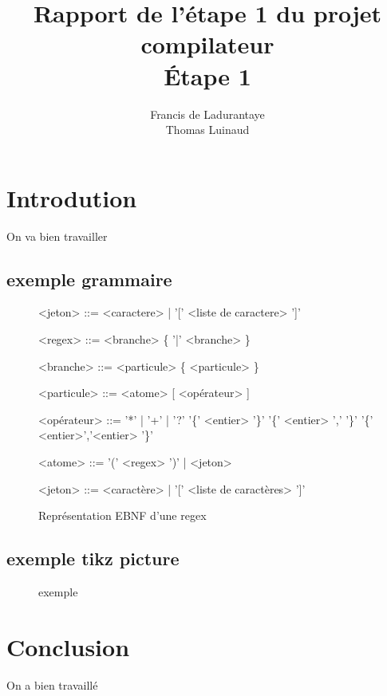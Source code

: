 \documentclass[]{article}
\title{Rapport de l'étape 1 du projet compilateur \\ Étape 1}
\author{Francis de Ladurantaye \\ Thomas Luinaud}
\begin{document}
\begin{titlepage}
	\maketitle
\end{titlepage}


\section{Introdution}
On va bien travailler

\subsection{exemple grammaire}
\begin{figure}[]
	\begin{grammarC}{<jeton> ::= <caractere> | '[' <liste de caractere> ']'}
		
		<regex> ::= <branche> \{ '|' <branche> \}
		
		<branche> ::= <particule> \{ <particule> \}
		
		<particule> ::= <atome>  [ <opérateur> ]
		
		<opérateur> ::= '*' | '+' | '?' 
		\alt  '\{' <entier> '\}' 
		\alt  '\{' <entier> ',' '\}' 
		\alt '\{' <entier>','<entier>  '\}'
		
		<atome> ::= '(' <regex> ')' | <jeton>
		
		<jeton> ::= <caractère> | '[' <liste de caractères> ']'
		
	\end{grammarC}
	\caption{Représentation EBNF d'une regex}
\end{figure}


\subsection{exemple tikz picture}
\begin{figure}
	
	\caption{exemple}
\end{figure}


\section{Conclusion}
On a bien travaillé
\end{document}
